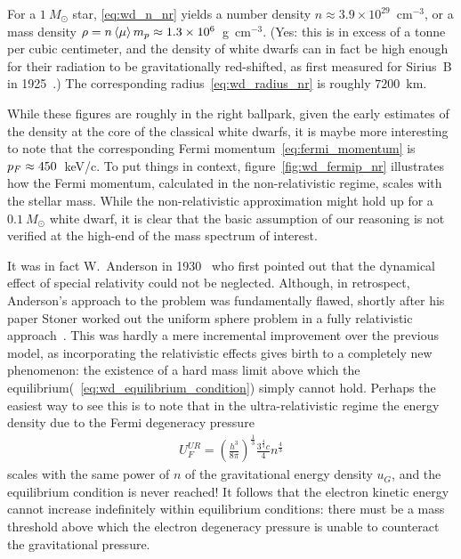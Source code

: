 \begin{marginfigure}
	
	\caption{Estimate for the Fermi momentum $\pF$ as a function of the mass of a
    white dwarf in the non-relativistic limit---this is calculated by simply
    plugging the non-relativistic expression for the number density~\eqref{eq:wd_n_nr}
    into the formula for the Fermi momentum~\eqref{eq:fermi_momentum}. We note
    that the hypothesis that the electrons in the Fermi gas are not relativistic
    $\pF \ll m_e c$, in fact, does not hold over most of the mass range of
    interest.}
    \label{fig:wd_fermip_nr}
\end{marginfigure}

For a $1~M_\odot$ star, \eqref{eq:wd_n_nr} yields a number density
$n \approx 3.9 \times 10^{29}$~cm$^{-3}$, or a mass density
$\rho = n \left<\mu\right> m_p \approx 1.3 \times 10^6$~g~cm$^{-3}$.
(Yes: this is in excess of a tonne per cubic centimeter, and the density of white
dwarfs can in fact be high enough for their radiation to be gravitationally red-shifted,
as first measured for Sirius~B in 1925~\cite{1925PNAS...11..382A}.) The corresponding
radius~\eqref{eq:wd_radius_nr} is roughly $7200$~km.

While these figures are roughly in the right ballpark, given the early estimates
of the density at the core of the classical white dwarfs, it is maybe more
interesting to note that the corresponding Fermi momentum~\eqref{eq:fermi_momentum}
is $p_F \approx 450$~keV/c. To put things in context, figure~\ref{fig:wd_fermip_nr}
illustrates how the Fermi momentum, calculated in the non-relativistic regime,
scales with the stellar mass. While the non-relativistic approximation might
hold up for a $0.1~M_\odot$ white dwarf, it is clear that the basic assumption of
our reasoning is not verified at the high-end of the mass spectrum of interest.

It was in fact W.~Anderson in 1930~\cite{1929ZPhy...56..851A} who first pointed
out that the dynamical effect of special relativity could not be neglected.
Although, in retrospect, Anderson's approach to the problem was fundamentally
flawed, shortly after his paper Stoner worked out the uniform sphere problem in
a fully relativistic approach~\cite{1930LEDPM...9..944S}. This was hardly a mere
incremental improvement over the previous model, as incorporating the relativistic
effects gives birth to a completely new phenomenon: the existence of a hard mass
limit above which the equilibrium(~\ref{eq:wd_equilibrium_condition}) simply cannot
hold. Perhaps the easiest way to see this is to note that in the ultra-relativistic
regime the energy density due to the Fermi degeneracy pressure
\begin{align*}
	U_F^{UR} = \left( \frac{h^3}{8\pi} \right)^\frac{1}{3}
	\frac{3^\frac{4}{3} c}{4} n^\frac{4}{3}
\end{align*}
scales with the same power of $n$ of the gravitational energy density $u_G$, and the
equilibrium condition is never reached! It follows that the electron kinetic
energy cannot increase indefinitely within equilibrium conditions: there must be
a mass threshold above which the electron degeneracy pressure is unable to counteract
the gravitational pressure.

